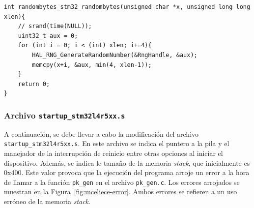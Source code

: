 \begin{lstlisting}[label={lst:mceliece-random},style=Cnice,firstnumber=1,caption={Función de generación de números aleatorios para McEliece348864.}]
int randombytes_stm32_randombytes(unsigned char *x, unsigned long long xlen){
    // srand(time(NULL));
    uint32_t aux = 0;
    for (int i = 0; i < (int) xlen; i+=4){
        HAL_RNG_GenerateRandomNumber(&RngHandle, &aux);
        memcpy(x+i, &aux, min(4, xlen-1));
    }
    return 0;
}
\end{lstlisting}

\subsubsection{Archivo \texttt{startup\_stm32l4r5xx.s}}\label{subsubsec:mceliece-startup}

A continuación, se debe llevar a cabo la modificación del archivo \texttt{startup\_stm32l4r5xx.s}.
En este archivo se indica el puntero a la pila y el manejador de la interrupción de reinicio entre otras opciones al iniciar el dispositivo.
Además, se indica le tamaño de la memoria \textit{stack}, que inicialmente es 0x400.
Este valor provoca que la ejecución del programa arroje un error a la hora de llamar a la función \texttt{pk\_gen} en el archivo \texttt{pk\_gen.c}.
Los errores arrojados se muestran en la Figura~\ref{fig:mceliece-error}.
Ambos errores se refieren a un uso erróneo de la memoria \textit{stack}.

